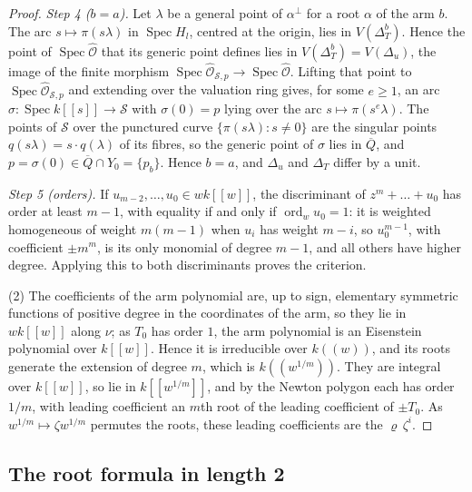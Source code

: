 \documentclass[11pt]{amsart}
\numberwithin{table}{section}
\numberwithin{figure}{section}
\numberwithin{equation}{section}
\theoremstyle{definition}
\theoremstyle{plain}
\newcommand{\cO}{\mathcal{O}}
\DeclareMathOperator{\Spec}{Spec}
\DeclareMathOperator{\ord}{ord}
\begin{document}
\begin{proof}
\emph{Step 4 ($b = a$).} Let $\lambda$ be a general point of $\alpha^\perp$ for a root $\alpha$ of the arm $b$. The arc $s \mapsto \pi(s\lambda)$ in $\Spec H_l$, centred at the origin, lies in $V(\Delta_T^b)$. Hence the point of $\Spec \widehat{\mathcal O}$ that its generic point defines lies in $V(\Delta_T^b) = V(\Delta_u)$, the image of the finite morphism $\Spec \widehat{\cO}_{\mathscr S,p} \to \Spec \widehat{\mathcal O}$. Lifting that point to $\Spec \widehat{\cO}_{\mathscr S,p}$ and extending over the valuation ring gives, for some $e \ge 1$, an arc $\sigma\colon \Spec k[[s]] \to \mathscr S$ with $\sigma(0) = p$ lying over the arc $s \mapsto \pi(s^e\lambda)$. The points of $\mathscr S$ over the punctured curve $\{\pi(s\lambda) : s \neq 0\}$ are the singular points $q(s\lambda) = s\cdot q(\lambda)$ of its fibres, so the generic point of $\sigma$ lies in $\overline Q$, and $p = \sigma(0) \in \overline Q \cap Y_0 = \{p_b\}$. Hence $b = a$, and $\Delta_u$ and $\Delta_T$ differ by a unit.

\emph{Step 5 (orders).} If $u_{m-2}, \dots, u_0 \in wk[[w]]$, the discriminant of $z^m + \dots + u_0$ has order at least $m - 1$, with equality if and only if $\ord_w u_0 = 1$: it is weighted homogeneous of weight $m(m-1)$ when $u_i$ has weight $m - i$, so $u_0^{m-1}$, with coefficient $\pm m^m$, is its only monomial of degree $m - 1$, and all others have higher degree. Applying this to both discriminants proves the criterion.

(2) The coefficients of the arm polynomial are, up to sign, elementary symmetric functions of positive degree in the coordinates of the arm, so they lie in $wk[[w]]$ along $\nu$; as $T_0$ has order $1$, the arm polynomial is an Eisenstein polynomial over $k[[w]]$. Hence it is irreducible over $k((w))$, and its roots generate the extension of degree $m$, which is $k((w^{1/m}))$. They are integral over $k[[w]]$, so lie in $k[[w^{1/m}]]$, and by the Newton polygon each has order $1/m$, with leading coefficient an $m$th root of the leading coefficient of $\pm T_0$. As $w^{1/m} \mapsto \zeta w^{1/m}$ permutes the roots, these leading coefficients are the $\varrho\,\zeta^i$.
\end{proof}

\subsection{The root formula in length 2}\label{ss:rootformula2}
\end{document}
